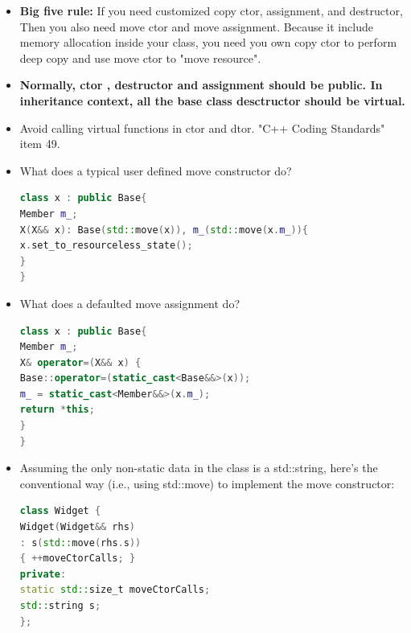\documentclass[a4paper,12pt,twoside]{book}
\newcommand{\Hilight}[1]{\makebox[0pt][l]{\color{yellow}\rule[-3pt]{#1em}{11pt}}}
\begin{document}
\begin{itemize}
\begin{lstlisting}[frame=single, language=c++, mathescape=true]
template<class T>
class Array : $\Hilight{23}$private ArrayBase, public Container

typedef Array AIType;
public:
Array( size_t startingSize = 10 )
: Container( startingSize ),
ArrayBase( Container::GetType() ),
\end{lstlisting}

\subsubsection{Basic routines}
\item \textbf{Big five rule:} If you need customized copy ctor, assignment, and destructor, Then you also need move ctor and move assignment. Because it include memory allocation inside your class, you need you own copy ctor to perform deep copy and use move ctor to "move resource".

\item \textbf{Normally, ctor , destructor and assignment should be public. In inheritance context, all the base class desctructor should be virtual. }

\item Avoid calling virtual functions in ctor and dtor. "C++ Coding Standards" item 49.

\item What does a typical user defined move constructor do?
\begin{lstlisting}[frame=single, language=c++]
class x : public Base{
Member m_;
X(X&& x): Base(std::move(x)), m_(std::move(x.m_)){
x.set_to_resourceless_state();
}
}
\end{lstlisting}

\item What does a defaulted move assignment do?
\begin{lstlisting}[frame=single, language=c++]
class x : public Base{
Member m_;
X& operator=(X&& x) {
Base::operator=(static_cast<Base&&>(x));
m_ = static_cast<Member&&>(x.m_);
return *this;
}
}
\end{lstlisting}



\item Assuming the only non-static data in the class is a std::string, here's the conventional way (i.e., using std::move) to implement the move constructor:
\begin{lstlisting}[frame=single, language=c++]
class Widget {
Widget(Widget&& rhs)
: s(std::move(rhs.s))
{ ++moveCtorCalls; }
private:
static std::size_t moveCtorCalls;
std::string s;
};
\end{lstlisting}


\end{itemize}
\end{document}
